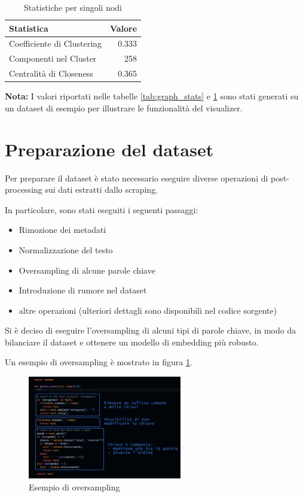 \begin{table}[H]
      \centering
      \caption{Statistiche per singoli nodi}
      \label{tab:node_stats}
      \begin{tabularx}{\textwidth}{@{}l @{\extracolsep{\fill}} r@{}}
            \toprule
            Statistica                 & Valore \\
            \midrule
            Coefficiente di Clustering & 0.333  \\
            Componenti nel Cluster     & 258    \\
            Centralità di Closeness    & 0.365  \\
            \bottomrule
      \end{tabularx}
\end{table}

\noindent
\textbf{Nota:}
I valori riportati nelle tabelle \ref{tab:graph_stats} e
\ref{tab:node_stats} sono stati generati su un dataset di
esempio per illustrare le funzionalità del visualizer.

\section{Preparazione del dataset}
\label{sec:dataset_prep}
Per preparare il dataset è stato necessario eseguire
diverse operazioni di post-processing sui dati estratti
dallo scraping.

In particolare, sono stati eseguiti i seguenti passaggi:
\begin{itemize}
      \item Rimozione dei metadati
      \item Normalizzazione del testo
      \item Oversampling di alcune parole chiave
      \item Introduzione di rumore nel dataset
      \item altre operazioni (ulteriori dettagli sono
            disponibili nel codice sorgente)
\end{itemize}

Si è deciso di eseguire l'oversampling di alcuni tipi di
parole chiave, in modo da bilanciare il dataset e ottenere
un modello di embedding più robusto.

Un esempio di oversampling è mostrato in figura
\ref{fig:oversampling}.

\begin{figure}[H]
      \centering
      \includegraphics[width=0.6\textwidth]{res/noise.png}
      \caption{Esempio di oversampling}
      \label{fig:oversampling}
\end{figure}

